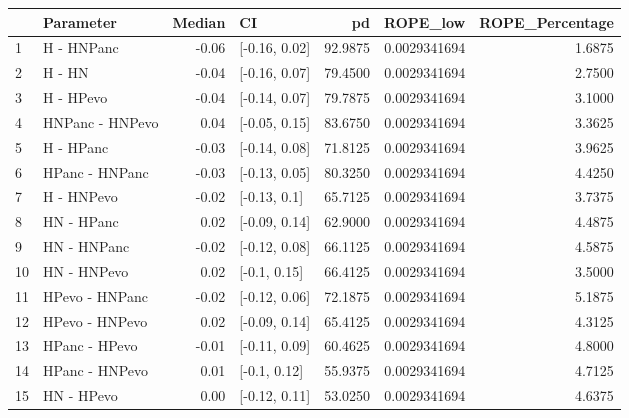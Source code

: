 \begin{table}[ht]
\centering
\begin{tabular}{llrlrrr}
  \hline
 & Parameter & Median & CI & pd & ROPE\_low & ROPE\_Percentage \\ 
  \hline
1 & H - HNPanc & -0.06 & [-0.16, 0.02] & 92.9875 & 0.0029341694 & 1.6875 \\ 
  2 & H - HN & -0.04 & [-0.16, 0.07] & 79.4500 & 0.0029341694 & 2.7500 \\ 
  3 & H - HPevo & -0.04 & [-0.14, 0.07] & 79.7875 & 0.0029341694 & 3.1000 \\ 
  4 & HNPanc - HNPevo & 0.04 & [-0.05, 0.15] & 83.6750 & 0.0029341694 & 3.3625 \\ 
  5 & H - HPanc & -0.03 & [-0.14, 0.08] & 71.8125 & 0.0029341694 & 3.9625 \\ 
  6 & HPanc - HNPanc & -0.03 & [-0.13, 0.05] & 80.3250 & 0.0029341694 & 4.4250 \\ 
  7 & H - HNPevo & -0.02 & [-0.13, 0.1] & 65.7125 & 0.0029341694 & 3.7375 \\ 
  8 & HN - HPanc & 0.02 & [-0.09, 0.14] & 62.9000 & 0.0029341694 & 4.4875 \\ 
  9 & HN - HNPanc & -0.02 & [-0.12, 0.08] & 66.1125 & 0.0029341694 & 4.5875 \\ 
  10 & HN - HNPevo & 0.02 & [-0.1, 0.15] & 66.4125 & 0.0029341694 & 3.5000 \\ 
  11 & HPevo - HNPanc & -0.02 & [-0.12, 0.06] & 72.1875 & 0.0029341694 & 5.1875 \\ 
  12 & HPevo - HNPevo & 0.02 & [-0.09, 0.14] & 65.4125 & 0.0029341694 & 4.3125 \\ 
  13 & HPanc - HPevo & -0.01 & [-0.11, 0.09] & 60.4625 & 0.0029341694 & 4.8000 \\ 
  14 & HPanc - HNPevo & 0.01 & [-0.1, 0.12] & 55.9375 & 0.0029341694 & 4.7125 \\ 
  15 & HN - HPevo & 0.00 & [-0.12, 0.11] & 53.0250 & 0.0029341694 & 4.6375 \\ 
   \hline
\end{tabular}
\end{table}

